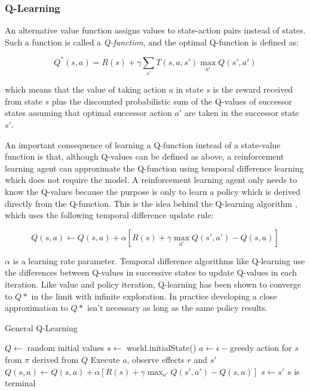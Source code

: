 \subsubsection{Q-Learning}

An alternative value function assigns values to state-action pairs instead of states. Such a function is called a {\it Q-function}, and the optimal Q-function is defined as:

\begin{equation}
Q^*(s, a) = R(s) + \gamma \sum_{s'} T(s, a, s') \max_{a'} Q(s', a')
\end{equation}

which means that the value of taking action $a$ in state $s$ is the reward received from state $s$ plus the discounted probabilistic sum of the Q-values of successor states assuming that optimal successor action $a'$ are taken in the successor state $s'$.

An important consequence of learning a Q-function instead of a state-value function is that, although Q-values can be defined as above, a reinforcement learning agent can approximate the Q-function using temporal difference learning which does not require the model. A reinforcement learning agent only needs to know the Q-values because the purpose is only to learn a policy which is derived directly from the Q-function. This is the idea behind the Q-learning algorithm \cite{watkins1989models}, which uses the following temporal difference update rule:

\begin{equation}\label{eqn:q-update}
Q(s, a) \leftarrow Q(s, a) + \alpha [R(s) + \gamma \max_{a'} Q(s', a') - Q(s, a)]
\end{equation}

$\alpha$ is a learning rate parameter. Temporal difference algorithms like Q-learning use the differences between Q-values in successive states to update Q-values in each iteration. Like value and policy iteration, Q-learning has been shown to converge to $Q*$ in the limit with infinite exploration. In practice developing a close approximation to $Q*$ isn't necessary as long as the same policy results.

\begin{algorithm}
  \caption{General Q-Learning}\label{alg:q-learning}
  \begin{algorithmic}
    \State $Q \gets$ random initial values
      \State $s \gets$ world.initialState()
      \Repeat
        \State $a \gets \epsilon-$greedy action for $s$ from $\pi$ derived from $Q$
        \State Execute $a$, observe effects $r$ and $s'$
        \State $Q(s, a) \gets Q(s, a) + \alpha [R(s) + \gamma \max_{a'} Q(s', a') - Q(s, a)]$
        \State $s \gets s'$
      \Until $s$ is terminal
    \EndFor
  \end{algorithmic}
\end{algorithm}


